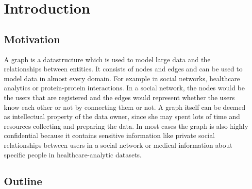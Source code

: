 
\chapter{Introduction}
	\justifying \noindent

	\section{Motivation}
		A graph is a datastructure which is used to model large data and the relationships between entities.
		It consists of nodes and edges and can be used to model data in almost every domain.
		For example in social networks, healthcare analytics or protein-protein interactions.
		In a social network, the nodes would be the users that are registered and the edges would represent whether the users know each other or not by connecting them or not.
		A graph itself can be deemed as intellectual property of the data owner, since she may spent lots of time and resources collecting and preparing the data.
		In most cases the graph is also highly confidential because it contains sensitive information like private social relationships between users in a social network or medical information about specific people in healthcare-analytic datasets.



	\section{Outline}
